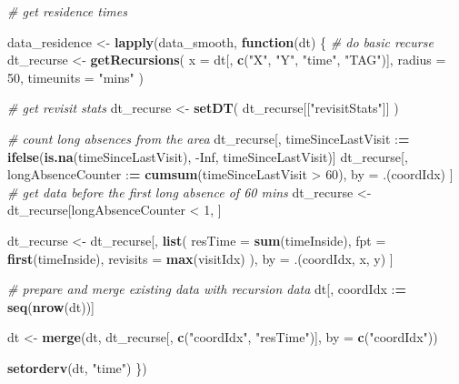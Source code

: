 \documentclass[]{scrartcl}
\newenvironment{Shaded}{}{}
\newcommand{\CommentTok}[1]{\textcolor[rgb]{0.38,0.63,0.69}{\textit{#1}}}
\newcommand{\ControlFlowTok}[1]{\textcolor[rgb]{0.00,0.44,0.13}{\textbf{#1}}}
\newcommand{\DataTypeTok}[1]{\textcolor[rgb]{0.56,0.13,0.00}{#1}}
\newcommand{\DecValTok}[1]{\textcolor[rgb]{0.25,0.63,0.44}{#1}}
\newcommand{\ErrorTok}[1]{\textcolor[rgb]{1.00,0.00,0.00}{\textbf{#1}}}
\newcommand{\KeywordTok}[1]{\textcolor[rgb]{0.00,0.44,0.13}{\textbf{#1}}}
\newcommand{\NormalTok}[1]{#1}
\newcommand{\OperatorTok}[1]{\textcolor[rgb]{0.40,0.40,0.40}{#1}}
\newcommand{\OtherTok}[1]{\textcolor[rgb]{0.00,0.44,0.13}{#1}}
\newcommand{\StringTok}[1]{\textcolor[rgb]{0.25,0.44,0.63}{#1}}
\begin{document}
\begin{Shaded}
\begin{Highlighting}[]
\CommentTok{# get residence times}

\NormalTok{data_residence <-}\StringTok{ }\KeywordTok{lapply}\NormalTok{(data_smooth, }\ControlFlowTok{function}\NormalTok{(dt) \{}
  \CommentTok{# do basic recurse}
\NormalTok{  dt_recurse <-}\StringTok{ }\KeywordTok{getRecursions}\NormalTok{(}
    \DataTypeTok{x =}\NormalTok{ dt[, }\KeywordTok{c}\NormalTok{(}\StringTok{"X"}\NormalTok{, }\StringTok{"Y"}\NormalTok{, }\StringTok{"time"}\NormalTok{, }\StringTok{"TAG"}\NormalTok{)],}
    \DataTypeTok{radius =} \DecValTok{50}\NormalTok{,}
    \DataTypeTok{timeunits =} \StringTok{"mins"}
\NormalTok{  )}
  
  \CommentTok{# get revisit stats}
\NormalTok{  dt_recurse <-}\StringTok{ }\KeywordTok{setDT}\NormalTok{(}
\NormalTok{    dt_recurse[[}\StringTok{"revisitStats"}\NormalTok{]]}
\NormalTok{  )}
  
  \CommentTok{# count long absences from the area}
\NormalTok{  dt_recurse[, timeSinceLastVisit }\OperatorTok{:}\ErrorTok{=}
\StringTok{          }\KeywordTok{ifelse}\NormalTok{(}\KeywordTok{is.na}\NormalTok{(timeSinceLastVisit), }\OperatorTok{-}\OtherTok{Inf}\NormalTok{, timeSinceLastVisit)]}
\NormalTok{  dt_recurse[, longAbsenceCounter }\OperatorTok{:}\ErrorTok{=}\StringTok{ }\KeywordTok{cumsum}\NormalTok{(timeSinceLastVisit }\OperatorTok{>}\StringTok{ }\DecValTok{60}\NormalTok{),}
\NormalTok{             by =}\StringTok{ }\NormalTok{.(coordIdx)}
\NormalTok{             ]}
  \CommentTok{# get data before the first long absence of 60 mins}
\NormalTok{  dt_recurse <-}\StringTok{ }\NormalTok{dt_recurse[longAbsenceCounter }\OperatorTok{<}\StringTok{ }\DecValTok{1}\NormalTok{, ]}
  
\NormalTok{  dt_recurse <-}\StringTok{ }\NormalTok{dt_recurse[, }\KeywordTok{list}\NormalTok{(}
    \DataTypeTok{resTime =} \KeywordTok{sum}\NormalTok{(timeInside),}
    \DataTypeTok{fpt =} \KeywordTok{first}\NormalTok{(timeInside),}
    \DataTypeTok{revisits =} \KeywordTok{max}\NormalTok{(visitIdx)}
\NormalTok{  ),}
\NormalTok{  by =}\StringTok{ }\NormalTok{.(coordIdx, x, y)}
\NormalTok{  ]}
  
  \CommentTok{# prepare and merge existing data with recursion data}
\NormalTok{  dt[, coordIdx }\OperatorTok{:}\ErrorTok{=}\StringTok{ }\KeywordTok{seq}\NormalTok{(}\KeywordTok{nrow}\NormalTok{(dt))]}
  
\NormalTok{  dt <-}\StringTok{ }\KeywordTok{merge}\NormalTok{(dt, }
\NormalTok{              dt_recurse[, }\KeywordTok{c}\NormalTok{(}\StringTok{"coordIdx"}\NormalTok{, }\StringTok{"resTime"}\NormalTok{)], }
              \DataTypeTok{by =} \KeywordTok{c}\NormalTok{(}\StringTok{"coordIdx"}\NormalTok{))}
  
  \KeywordTok{setorderv}\NormalTok{(dt, }\StringTok{"time"}\NormalTok{)}
\NormalTok{\})}
\end{Highlighting}
\end{Shaded}
\end{document}
